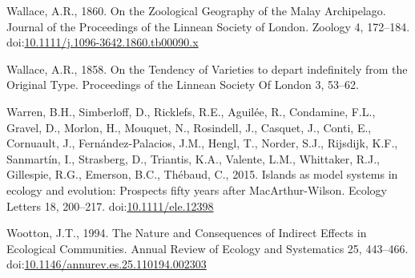 \hypertarget{ref-Wallace1860}{}
Wallace, A.R., 1860. On the Zoological Geography of the Malay
Archipelago. Journal of the Proceedings of the Linnean Society of
London. Zoology 4, 172--184.
doi:\href{https://doi.org/10.1111/j.1096-3642.1860.tb00090.x}{10.1111/j.1096-3642.1860.tb00090.x}

\hypertarget{ref-Wallace1858}{}
Wallace, A.R., 1858. On the Tendency of Varieties to depart indefinitely
from the Original Type. Proceedings of the Linnean Society Of London 3,
53--62.

\hypertarget{ref-Warren2015}{}
Warren, B.H., Simberloff, D., Ricklefs, R.E., Aguilée, R., Condamine,
F.L., Gravel, D., Morlon, H., Mouquet, N., Rosindell, J., Casquet, J.,
Conti, E., Cornuault, J., Fernández-Palacios, J.M., Hengl, T., Norder,
S.J., Rijsdijk, K.F., Sanmartín, I., Strasberg, D., Triantis, K.A.,
Valente, L.M., Whittaker, R.J., Gillespie, R.G., Emerson, B.C., Thébaud,
C., 2015. Islands as model systems in ecology and evolution: Prospects
fifty years after MacArthur-Wilson. Ecology Letters 18, 200--217.
doi:\href{https://doi.org/10.1111/ele.12398}{10.1111/ele.12398}

\hypertarget{ref-Wootton1994a}{}
Wootton, J.T., 1994. The Nature and Consequences of Indirect Effects in
Ecological Communities. Annual Review of Ecology and Systematics 25,
443--466.
doi:\href{https://doi.org/10.1146/annurev.es.25.110194.002303}{10.1146/annurev.es.25.110194.002303}
